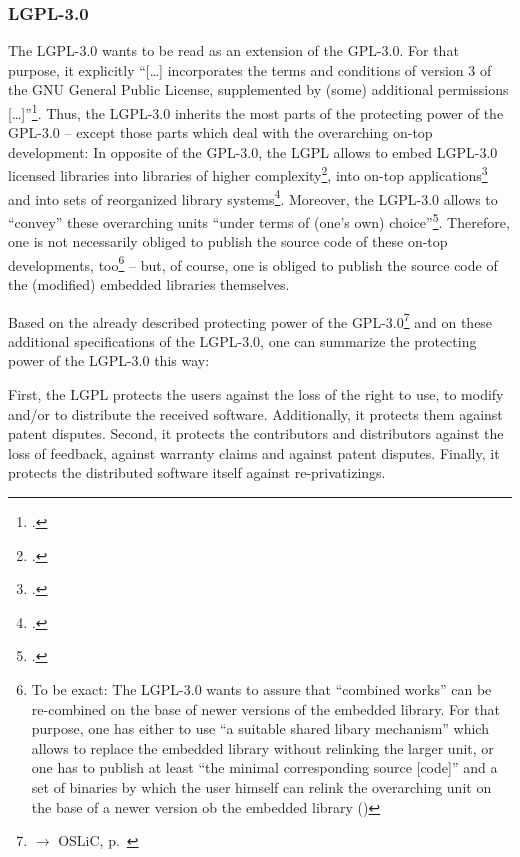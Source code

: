 \subsubsection {LGPL-3.0}\label{subsec:ProtectingPowerOfLgpl30}

The LGPL-3.0 wants to be read as an extension of the GPL-3.0. For that purpose,
it explicitly \enquote{[\ldots] incorporates the terms and conditions of version
3 of the GNU General Public License, supplemented by (some) additional
permissions [\ldots]}\footcite[cf.][\nopage wp., just before
§0.]{Lgpl30FsfLicense2007a}. Thus, the LGPL-3.0 inherits the most parts of the
protecting power of the GPL-3.0 -- except those parts which deal with the
overarching on-top development: In opposite of the GPL-3.0, the LGPL allows to
embed LGPL-3.0 licensed libraries into libraries of higher
complexity\footcite[cf.][\nopage wp.
§3]{Lgpl30FsfLicense2007a}, into on-top applications\footcite[cf.][\nopage wp.
§4]{Lgpl30FsfLicense2007a} and into sets of reorganized library
systems\footcite[cf.][\nopage wp. §5]{Lgpl30FsfLicense2007a}. Moreover, the
LGPL-3.0 allows to \enquote{convey} these overarching units \enquote{under terms
of (one's own) choice}\footcite[cf.][\nopage wp. §4]{Lgpl30FsfLicense2007a}.
Therefore, one is not necessarily obliged to publish the source code of these
on-top developments, too\footnote{To be exact: The LGPL-3.0 wants to assure that
\enquote{combined works} can be re-combined on the base of newer versions of the
embedded library. For that purpose, one has either to use \enquote{a suitable
shared libary mechanism} which allows to replace the embedded library without
relinking the larger unit, or one has to publish at least \enquote{the minimal
corresponding source [code]} and a set of binaries by which the user himself can
relink the overarching unit on the base of a newer version ob the embedded
library (\cite[cf.][\nopage wp. §4]{Lgpl30FsfLicense2007a})} -- but, of course,
one is obliged to publish the source code of the (modified) embedded libraries
themselves.

Based on the already described protecting power of the
GPL-3.0\footnote{$\rightarrow$ OSLiC, p.\
\pageref{subsec:ProtectingPowerOfGpl30}} and on these additional specifications
of the LGPL-3.0, one can summarize the protecting power of the LGPL-3.0 this
way:

First, the LGPL protects the users against the loss of the right to use, to
modify and/or to distribute the received software. Additionally, it protects
them against patent disputes. Second, it protects the contributors and
distributors against the loss of feedback, against warranty claims and against
patent disputes. Finally, it protects the distributed software itself against
re-privatizings.

